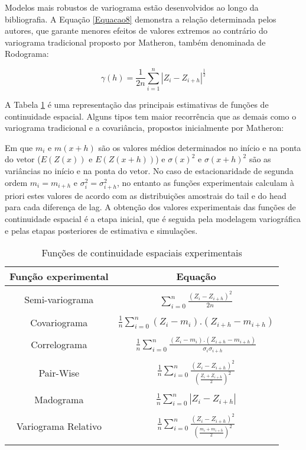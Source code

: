 Modelos mais robustos de variograma estão desenvolvidos ao longo da bibliografia. A Equação \ref{Equacao8} demonstra a relação determinada pelos autores, que garante menores efeitos de valores extremos ao contrário do variograma tradicional proposto por Matheron, também denominada de Rodograma: 

\begin{equation}\label{Equacao8}
\gamma(h) = \frac{1}{2n} \sum_{i=1}^{n} \left|  Z_i - Z_{i+h} \right| ^\frac{1}{2}
\end{equation}

A Tabela \ref{Tabela 3} é uma representação das principais estimativas de funções de continuidade espacial. Alguns tipos tem maior recorrência que as demais como o variograma tradicional e a covariância, propostos inicialmente por Matheron:

Em que $m_i$ e $m(x+h)$ são os valores médios determinados no início e na ponta do vetor ($E(Z(x))$ e $E(Z(x+h))$) e  $\sigma(x)^2$ e $\sigma(x+h)^2$ são as variâncias no início e na ponta do vetor. No caso de estacionaridade de segunda ordem $m_i = m_{i+h}$ e  $\sigma_i^2 = \sigma_{i+h}^2$, no entanto as funções experimentais calculam à priori estes valores de acordo com as distribuições amostrais do tail e do head para cada diferença de lag. A obtenção dos valores experimentais das funções de continuidade espacial é a etapa inicial, que é seguida pela modelagem variográfica e pelas etapas posteriores de estimativa e simulações.

\begin{table}[H]
	\centering
	\caption{Funções de continuidade espaciais experimentais}
	\label{Tabela 3}
	\begin{tabular}{cc}
		\toprule
		\textbf{Função experimental} &  \textbf{Equação} \\\midrule \\
		Semi-variograma                      & $\sum_{i=0}^{n}\frac{\left( Z_i - Z_{i+h} \right)^2 }{2n} $      \\ \\
		Covariograma                        & $\frac{1}{n}\sum_{i=0}^{n} (Z_i-m_i).(Z_{i+h}-m_{i+h})$       \\ \\
		Correlograma                       & $\frac{1}{n}\sum_{i=0}^{n}\frac{ (Z_i-m_i).(Z_{i+h}-m_{i+h})}{\sigma_i\sigma_{i+h}}$   \\   \\
		Pair-Wise                       & $\frac{1}{n}\sum_{i=0}^{n} \frac{(Z_i-Z_{i+h})^2}{\left( \frac{Z_i + Z_{i+h}}{2}\right)^2}$      \\ \\
		Madograma                      & $\frac{1}{n} \sum_{i=0}^{n} \left| Z_i -Z_{i+h} \right|  $       \\ \\ 
		Variograma Relativo              & 
		$\frac{1}{n}\sum_{i=0}^{n} \frac{(Z_i-Z_{i+h})^2}{\left( \frac{m_i + m_{i+h}}{2}\right)^2}$      \\ \\ \bottomrule     
	\end{tabular}
\end{table}

